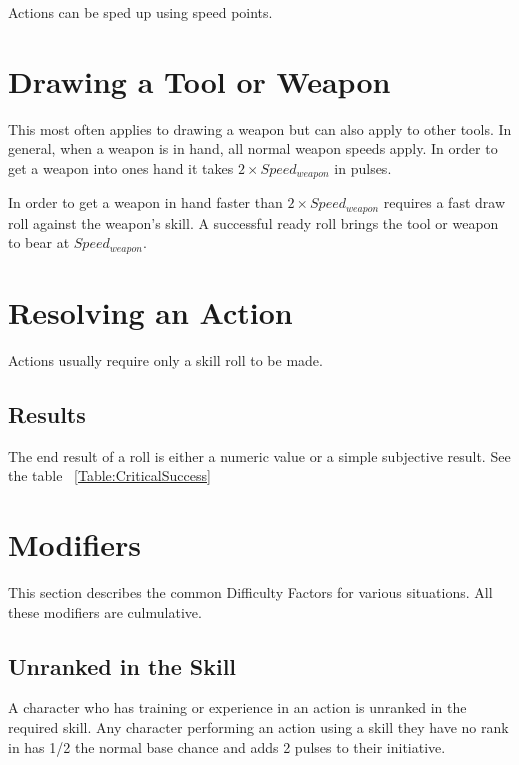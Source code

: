 Actions can be sped up using speed points. 


\section{Drawing a Tool or Weapon}


This most often applies to drawing a weapon but can also apply to 
other tools. In general, when a weapon is in hand, all normal weapon 
speeds apply. In order to get a weapon into ones hand it takes 
\( 2 \times Speed_{weapon} \) in pulses. 

In order to get a weapon in hand faster than \( 2 \times 
Speed_{weapon} \) requires a fast draw roll against the weapon's 
skill. A successful ready roll brings the tool or weapon to bear at
\( Speed_{weapon} \).


\section{Resolving an Action}

Actions usually require only a skill roll to be made. 

\subsection{Results}

The end result of a roll is either a numeric value or a simple 
subjective result. See the table ~\ref{Table:CriticalSuccess}

\section{Modifiers} 

This section describes the common Difficulty Factors for various 
situations. All these modifiers are culmulative.

\subsection{Unranked in the Skill}

A character who has training or experience in an action is
unranked in the required skill. Any character performing an action using 
a skill they have no rank in has 1/2 the normal base chance and adds 2 pulses to 
their initiative. 

\subsection{}


